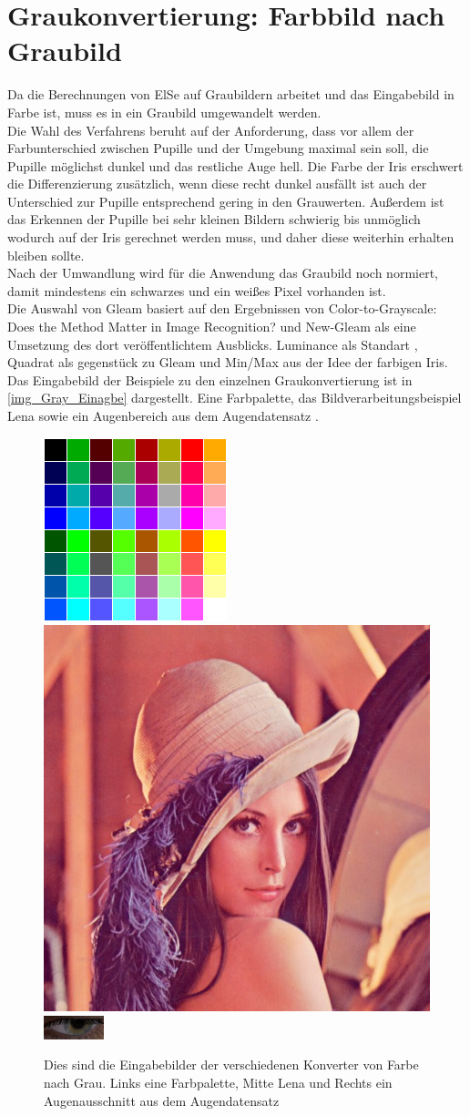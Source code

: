 \section{Graukonvertierung: Farbbild nach Graubild}
\label{Graubild}
Da die Berechnungen von ElSe auf Graubildern arbeitet und das Eingabebild in Farbe ist, muss es in ein Graubild umgewandelt werden.\\
Die Wahl des Verfahrens beruht auf der Anforderung, dass vor allem der Farbunterschied zwischen Pupille und der Umgebung maximal sein soll, die Pupille möglichst dunkel und das restliche Auge hell. Die Farbe der Iris erschwert die Differenzierung zusätzlich, wenn diese recht dunkel ausfällt ist auch der Unterschied zur Pupille entsprechend gering in den Grauwerten. Außerdem ist das Erkennen der Pupille bei sehr kleinen Bildern schwierig bis unmöglich wodurch auf der Iris gerechnet werden muss, und daher diese weiterhin erhalten bleiben sollte.\\
Nach der Umwandlung wird für die Anwendung das Graubild noch normiert, damit mindestens ein schwarzes und ein weißes Pixel vorhanden ist.\\
Die Auswahl von Gleam basiert auf den Ergebnissen von \glqq Color-to-Grayscale: Does the Method Matter in Image Recognition?\grqq \cite{rgb_to_Gray} und New-Gleam als eine Umsetzung des dort veröffentlichtem Ausblicks. Luminance als Standart , Quadrat als gegenstück zu Gleam und Min/Max aus der Idee der farbigen Iris.\\
Das Eingabebild der Beispiele zu den einzelnen Graukonvertierung ist in \autoref{img_Gray_Einagbe} dargestellt. Eine Farbpalette, das Bildverarbeitungsbeispiel Lena sowie ein Augenbereich aus dem Augendatensatz \cite{database_Eye}. 
\begin{figure}
	\centering
	\includegraphics[width=0.2\linewidth]{img/Farbtafel2}
	\includegraphics[width=0.2\linewidth]{img/lena}
	\includegraphics[width=0.2\linewidth]{img/Auge}
	\caption{Dies sind die Eingabebilder der verschiedenen Konverter von Farbe nach Grau. Links eine Farbpalette, Mitte Lena und Rechts ein Augenausschnitt aus dem Augendatensatz \cite{database_Eye}}
	\label{img_Gray_Einagbe}
\end{figure}
